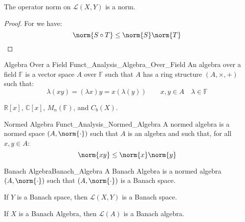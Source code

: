         \begin{theorem}
            The operator norm on $\mathscr{L}(X,Y)$ is a norm.
        \end{theorem}
        \begin{proof}
            For we have:
            \begin{equation}
                \norm{S\circ{T}}\leq\norm{S}\norm{T}
            \end{equation}
        \end{proof}
        \begin{ldefinition}{Algebra Over a Field}
              {Funct_Analysis_Algebra_Over_Field}
            An algebra over a field $\mathbb{F}$ is a vector
            space $A$ over $\mathbb{F}$ such that $A$ has a ring
            structure $(A,\times,+)$ such that:
            \begin{equation}
                \lambda(xy)=(\lambda{x})y
                =x(\lambda(y))
                \quad\quad
                x,y\in{A}
                \quad\lambda\in\mathbb{F}
            \end{equation}
        \end{ldefinition}
        \begin{example}
            $\mathbb{R}[x]$, $\mathbb{C}[x]$, $M_{n}(\mathbb{F})$, and
            $C_{b}(X)$.
        \end{example}
        \begin{ldefinition}{Normed Algebra}
              {Funct_Analysis_Normed_Algebra}
            A normed algebra is a normed space $(A,\norm{\cdot})$
            such that $A$ is an algebra and such that,
            for all $x,y\in{A}$:
            \begin{equation}
                \norm{xy}\leq\norm{x}\norm{y}
            \end{equation}
        \end{ldefinition}
        \begin{ldefinition}{Banach Algebra}{Banach_Algebra}
            A Banach Algebra is a normed algebra $(A,\norm{\cdot})$
            such that $(A,\norm{\cdot})$ is a Banach space.
        \end{ldefinition}
        \begin{theorem}
            If $Y$ is a Banach space, then $\mathscr{L}(X,Y)$
            is a Banach space.
        \end{theorem}
        \begin{theorem}
            If $X$ is a Banach Algebra, then
            $\mathscr{L}(A)$ is a Banach algebra.
        \end{theorem}

